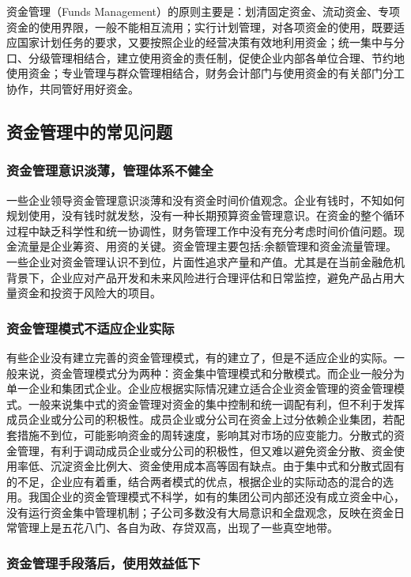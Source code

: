 
    资金管理（Funds Management）的原则主要是：划清固定资金、流动资金、专项资金的使用界限，一般不能相互流用；实行计划管理，对各项资金的使用，既要适应国家计划任务的要求，又要按照企业的经营决策有效地利用资金；统一集中与分口、分级管理相结合，建立使用资金的责任制，促使企业内部各单位合理、节约地使用资金；专业管理与群众管理相结合，财务会计部门与使用资金的有关部门分工协作，共同管好用好资金。

\subsection {资金管理中的常见问题}

    \subsubsection {资金管理意识淡薄，管理体系不健全}

    一些企业领导资金管理意识淡薄和没有资金时间价值观念。企业有钱时，不知如何规划使用，没有钱时就发愁，没有一种长期预算资金管理意识。在资金的整个循环过程中缺乏科学性和统一协调性，财务管理工作中没有充分考虑时间价值问题。现金流量是企业筹资、用资的关键。资金管理主要包括:余额管理和资金流量管理。一些企业对资金管理认识不到位，片面性追求产量和产值。尤其是在当前金融危机背景下，企业应对产品开发和未来风险进行合理评估和日常监控，避免产品占用大量资金和投资于风险大的项目。

    \subsubsection {资金管理模式不适应企业实际}

    有些企业没有建立完善的资金管理模式，有的建立了，但是不适应企业的实际。一般来说，资金管理模式分为两种：资金集中管理模式和分散模式。而企业一般分为单一企业和集团式企业。企业应根据实际情况建立适合企业资金管理的资金管理模式。一般来说集中式的资金管理对资金的集中控制和统一调配有利，但不利于发挥成员企业或分公司的积极性。成员企业或分公司在资金上过分依赖企业集团，若配套措施不到位，可能影响资金的周转速度，影响其对市场的应变能力。分散式的资金管理，有利于调动成员企业或分公司的积极性，但又难以避免资金分散、资金使用率低、沉淀资金比例大、资金使用成本高等固有缺点。由于集中式和分散式固有的不足，企业应有着重，结合两者模式的优点，根据企业的实际动态的混合的选用。我国企业的资金管理模式不科学，如有的集团公司内部还没有成立资金中心，没有运行资金集中管理机制；子公司多数没有大局意识和全盘观念，反映在资金日常管理上是五花八门、各自为政、存贷双高，出现了一些真空地带。

    \subsubsection {资金管理手段落后，使用效益低下}

